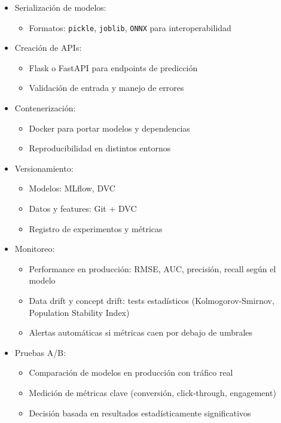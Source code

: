 \documentclass[12pt,a4paper,openany,oneside]{book}
\begin{document}
\begin{itemize}
\begin{itemize}
    \item Serialización de modelos:
    \begin{itemize}
        \item Formatos: \texttt{pickle}, \texttt{joblib}, \texttt{ONNX} para interoperabilidad
    \end{itemize}
    
    \item Creación de APIs:
    \begin{itemize}
        \item Flask o FastAPI para endpoints de predicción
        \item Validación de entrada y manejo de errores
    \end{itemize}
    
    \item Contenerización:
    \begin{itemize}
        \item Docker para portar modelos y dependencias
        \item Reproducibilidad en distintos entornos
    \end{itemize}

    \item Versionamiento:
    \begin{itemize}
        \item Modelos: MLflow, DVC
        \item Datos y features: Git + DVC
        \item Registro de experimentos y métricas
    \end{itemize}
    
    \item Monitoreo:
    \begin{itemize}
        \item Performance en producción: RMSE, AUC, precisión, recall según el modelo
        \item Data drift y concept drift: tests estadísticos (Kolmogorov-Smirnov, Population Stability Index)
        \item Alertas automáticas si métricas caen por debajo de umbrales
    \end{itemize}
    
    \item Pruebas A/B:
    \begin{itemize}
        \item Comparación de modelos en producción con tráfico real
        \item Medición de métricas clave (conversión, click-through, engagement)
        \item Decisión basada en resultados estadísticamente significativos
    \end{itemize}
\end{itemize}


\end{itemize}
\end{document}
